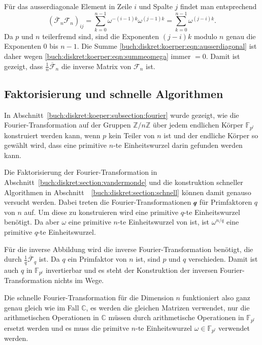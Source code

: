 Für das ausserdiagonale Element in Zeile $i$ und Spalte $j$
findet man entsprechend
\begin{equation}
(\overline{\mathscr{F}}_n
\mathscr{F}_n)_{i\!j}
=
\sum_{k=0}^{n-1}
\omega^{-(i-1)k}\omega^{(j-1)k}
=
\sum_{k=0}^{n-1} \omega^{(j-i)k}.
\label{buch:diskret:koerper:eqn:ausserdiagonal}
\end{equation}
Da $p$ und $n$ teilerfremd sind, sind die Exponenten $(j-i)k$
modulo $n$ genau die Exponenten $0$ bis $n-1$.
Die Summe
\eqref{buch:diskret:koerper:eqn:ausserdiagonal}
ist daher wegen
\eqref{buch:diskret:koerper:eqn:summeomega}
immer $=0$.
Damit ist gezeigt, dass $\frac1n\overline{\mathscr{F}}_n$ die
inverse Matrix von $\mathscr{F}_n$ ist.

%
%
\subsection{Faktorisierung und schnelle Algorithmen
\label{buch:diskret:koerper:subsection:faktorisierung}}
In Abschnitt~\ref{buch:diskret:koeper:subsection:fourier} wurde
gezeigt, wie die Fourier-Transformation auf der Gruppen
$\mathbb{Z}/n\mathbb{Z}$ über jedem endlichen Körper $\mathbb{F}_{p^l}$
konstruiert werden kann, wenn $p$ kein Teiler von $n$ ist und
der endliche Körper so gewählt wird, dass eine primitive $n$-te
Einheitswurzel darin gefunden werden kann.

Die Faktorisierung der Fourier-Transformation in
Abschnitt~\ref{buch:diskret:section:vandermonde}
und die konstruktion schneller Algorithmen in
Abschnitt~ \ref{buch:diskret:section:schnell} können damit
genauso versucht werden.
Dabei treten die Fourier-Transformationen $\mathscr{q}$ für Primfaktoren
$q$ von $n$ auf.
Um diese zu konstruieren wird eine primitive $q$-te Einheitswurzel benötigt.
Da aber $\omega$ eine primitive $n$-te Einheitswurzel von ist, ist
$\omega^{n/q}$ eine primitive $q$-te Einheitswurzel.

Für die inverse Abbildung wird die inverse Fourier-Transformation
benötigt, die durch $\frac{1}{q}\overline{\mathscr{F}}_q$ ist.
Da $q$ ein Primfaktor von $n$ ist, sind $p$ und $q$ verschieden.
Damit ist auch $q$ in $\mathbb{F}_{p^l}$ invertierbar und es steht
der Konstruktion der inversen Fourier-Transformation nichts im Wege.

Die schnelle Fourier-Transformation für die Dimension $n$ funktioniert
also ganz genau gleich wie im Fall $\mathbb{C}$, es werden die gleichen
Matrizen verwendet, nur die arithmetischen Operationen in $\mathbb{C}$
müssen durch arithmetische Operationen in $\mathbb{F}_{p^l}$ ersetzt
werden und es muss die primitve $n$-te Einheitswurzel
$\omega\in\mathbb{F}_{p^l}$ verwendet werden.

